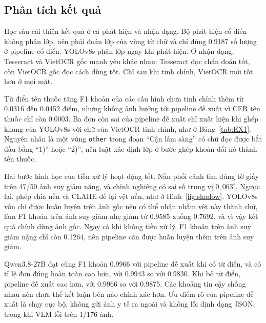 \subsection{Phân tích kết quả}
Học sâu cải thiện kết quả ở cả phát hiện và nhận dạng.
Bộ phát hiện cổ điển không phân lớp, nên phải đoán lớp của vùng từ chữ và chỉ đúng \num{0.9187} số lượng ở pipeline cổ điển.
YOLOv8s phân lớp ngay khi phát hiện.
Ở nhận dạng, Tesseract và VietOCR gốc mạnh yếu khác nhau: Tesseract đọc chẩn đoán tốt, còn VietOCR gốc đọc cách dùng tốt.
Chỉ sau khi tinh chỉnh, VietOCR mới tốt hơn ở mọi mặt.

Từ điển tên thuốc tăng F1 khoản của các cấu hình chưa tinh chỉnh thêm từ \num{0.0316} đến \num{0.0452} điểm, nhưng không ảnh hưởng tới pipeline đề xuất vì CER tên thuốc chỉ còn \num{0.0003}.
Ba đơn còn sai của pipeline đề xuất chỉ xuất hiện khi ghép khung của YOLOv8s với chữ của VietOCR tinh chỉnh, như ở Bảng~\ref{tab:EX1}.
Nguyên nhân là một vùng \texttt{other} trong đoạn ``Cận lâm sàng'' có chữ đọc được bắt đầu bằng ``1)'' hoặc ``2)'', nên luật xác định lớp ở bước ghép khoản đổi nó thành tên thuốc.

Hai bước hình học của tiền xử lý hoạt động tốt.
Nắn phối cảnh tìm đúng tờ giấy trên 47/50 ảnh suy giảm nặng, và chỉnh nghiêng có sai số trung vị $0{,}063^\circ$.
Ngược lại, phép chia nền và CLAHE để lại vệt nền, như ở Hình~\ref{fig:shadow}.
YOLOv8s vốn chỉ được huấn luyện trên ảnh gốc nên có thể nhận nhầm vệt này thành chữ, làm F1 khoản trên ảnh suy giảm nhẹ giảm từ \num{0.9585} xuống \num{0.7692}, và vì vậy kết quả chính dùng ảnh gốc.
Ngay cả khi không tiền xử lý, F1 khoản trên ảnh suy giảm nặng chỉ còn \num{0.1264}, nên pipeline cần được huấn luyện thêm trên ảnh suy giảm.

Qwen3.8-27B đạt cùng F1 khoản \num{0.9966} với pipeline đề xuất khi có từ điển, và có tỉ lệ đơn đúng hoàn toàn cao hơn, với \num{0.9943} so với \num{0.9830}.
Khi bỏ từ điển, pipeline đề xuất cao hơn, với \num{0.9966} so với \num{0.9875}.
Các khoảng tin cậy chồng nhau nên chưa thể kết luận bên nào chính xác hơn.
Ưu điểm rõ của pipeline đề xuất là chạy cục bộ, không gửi ảnh y tế ra ngoài và không lỗi định dạng JSON, trong khi VLM lỗi trên 1/176 ảnh.

